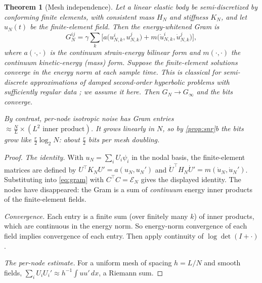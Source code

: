 \documentclass[11pt]{article}
\newtheorem{theorem}{Theorem}
\theoremstyle{definition}
\theoremstyle{remark}
\newcommand{\Em}{\mathcal{E}}         %
\begin{document}
\begin{theorem}[Mesh independence]\label{thm:mesh}
Let a linear elastic body be semi-discretized by conforming finite elements, with
consistent mass $H_N$ and stiffness $K_N$, and let $u_N(t)$ be the finite-element field. Then the
energy-whitened Gram is
\[
  G_N^{ij}=\gamma\sum_k\Big[a\big(u^i_{N,k},u^j_{N,k}\big)+m\big(\dot u^i_{N,k},\dot u^j_{N,k}\big)\Big],
\]
where $a(\cdot,\cdot)$ is the continuum strain-energy bilinear form and $m(\cdot,\cdot)$ the
continuum kinetic-energy (mass) form. Suppose the finite-element solutions converge in the
energy norm at each sample time. This is classical for semi-discrete approximations of
damped second-order hyperbolic problems with sufficiently regular data
\citep{dupont1973l2,baker1976error,geveci1984convergence}; we \emph{assume} it here. Then
$G_N\to G_\infty$ and the bits converge.

By contrast, per-node isotropic noise has Gram entries
$\approx\frac{N}{L}\times(L^2\text{ inner product})$. It grows linearly in $N$, so by
\cref{prop:snr}b the bits grow like $\frac r2\log_2N$: about $\frac r2$ bits per mesh
doubling.
\end{theorem}
\begin{proof}
\emph{The identity.} With $u_N=\sum_iU_i\psi_i$ in the nodal basis, the finite-element
matrices are defined by $U^\top K_NU'=a(u_N,u_N')$ and $\dot U^\top H_N\dot U'=m(\dot
u_N,\dot u_N')$. Substituting into \eqref{eq:gram} with $C^\top C=\Em_N$ gives the
displayed identity. The nodes have disappeared: the Gram is a sum of \emph{continuum}
energy inner products of the finite-element fields.

\emph{Convergence.} Each entry is a finite sum (over finitely many $k$) of inner products,
which are continuous in the energy norm. So energy-norm convergence of each field implies
convergence of each entry. Then apply continuity of $\log\det(I+\cdot)$.

\emph{The per-node estimate.} For a uniform mesh of spacing $h=L/N$ and smooth fields,
$\sum_iU_iU_i'\approx h^{-1}\int uu'\,dx$, a Riemann sum.
\end{proof}
\end{document}
